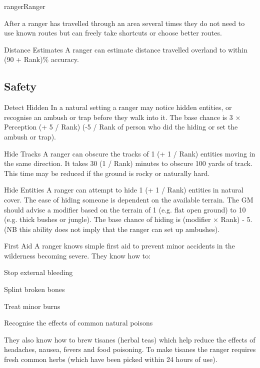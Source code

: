 \begin{Skill}[2.1]{ranger}{Ranger}
\begin{Description}
  After a ranger has travelled through an area several times they do
  not need to use known routes but can freely take shortcuts or choose
  better routes.

\item[Distance Estimates] A ranger can estimate distance travelled
  overland to within (90 + Rank)\% accuracy.

\end{Description}

\subsection{Safety}

\begin{Description}
\item[Detect Hidden] In a natural setting a ranger may notice hidden
  entities, or recognise an ambush or trap before they walk into
  it.  The base chance is 3 × Perception (+ 5 / Rank) (-5 / Rank of
  person who did the hiding or set the ambush or trap).

\item[Hide Tracks] A ranger can obscure the tracks of 1 (+ 1 / Rank)
  entities moving in the same direction.  It takes 30 (1 / Rank)
  minutes to obscure 100 yards of track.  This time may be reduced if
  the ground is rocky or naturally hard.

\item[Hide Entities] A ranger can attempt to hide 1 (+ 1 / Rank)
  entities in natural cover. The ease of hiding someone is dependent
  on the available terrain. The GM should advise a modifier based on
  the terrain of 1 (e.g. flat open ground) to 10 (e.g. thick bushes or
  jungle). The base chance of hiding is (modifier × Rank) - 5. (NB
  this ability does not imply that the ranger can set up ambushes).

\item[First Aid] A ranger knows simple first aid to prevent minor
  accidents in the wilderness becoming severe. They know how to:
\begin{Itemize}
\item Stop external bleeding  
\item Splint broken bones  
\item Treat minor burns  
\item Recognise the effects of common natural poisons 
\end{Itemize}

They also know how to brew tisanes (herbal teas) which help reduce the
effects of headaches, nausea, fevers and food poisoning.  To make
tisanes the ranger requires fresh common herbs (which have been picked
within 24 hours of use).


\end{Description}
\end{Skill}
